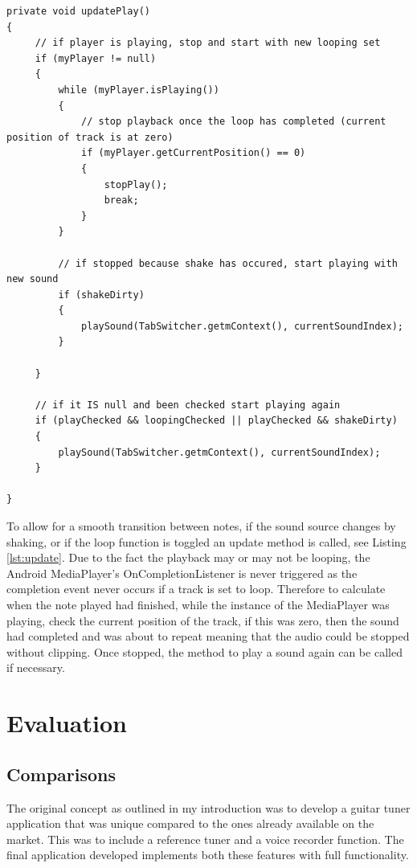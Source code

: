 \documentclass[conference]{acmsiggraph}
\begin{document}
\begin{lstlisting}[label = {lst:update}, caption={Method to stop playing gracefully when looping or shake has occured.}]
 private void updatePlay()
{
	 // if player is playing, stop and start with new looping set
	 if (myPlayer != null)
	 {
		 while (myPlayer.isPlaying())
		 {
			 // stop playback once the loop has completed (current position of track is at zero)
			 if (myPlayer.getCurrentPosition() == 0)
		     {
				 stopPlay();
				 break;
			 }
		 }
 
		 // if stopped because shake has occured, start playing with new sound
		 if (shakeDirty)
		 {
			 playSound(TabSwitcher.getmContext(), currentSoundIndex);
		 }
 
	 }
	 
	 // if it IS null and been checked start playing again 
	 if (playChecked && loopingChecked || playChecked && shakeDirty)    
	 {
		 playSound(TabSwitcher.getmContext(), currentSoundIndex);
	 }
 
}
\end{lstlisting}


To allow for a smooth transition between notes, if the sound source changes by shaking, or if the loop function is toggled an update method is called, see Listing \ref{lst:update}. Due to the fact the playback may or may not be looping, the Android MediaPlayer's OnCompletionListener is never triggered as the completion event never occurs if a track is set to loop. Therefore to calculate when the note played had finished, while the instance of the MediaPlayer was playing, check the current position of the track, if this was zero, then the sound had completed and was about to repeat meaning that the audio could be stopped without clipping. Once stopped, the method to play a sound again can be called if necessary.

\section{Evaluation}

\subsection{Comparisons}

The original concept as outlined in my introduction was to develop a guitar tuner application that was unique compared to the ones already available on the market. This was to include a reference tuner and a voice recorder function. The final application developed implements both these features with full functionality. 
\end{document}
